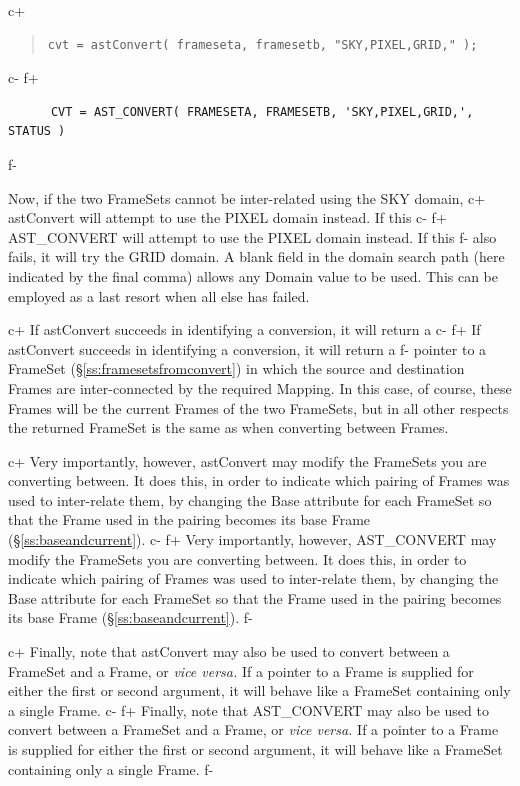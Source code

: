 \documentclass[twoside,11pt]{article}
\newcommand{\secref}[1]{\S\ref{#1}}
\newcommand{\secref}[1]{\ref{#1}}
\begin{document}
c+
\begin{quote}
\small
\begin{verbatim}
cvt = astConvert( frameseta, framesetb, "SKY,PIXEL,GRID," );
\end{verbatim}
\normalsize
\end{quote}
c-
f+
\small
\begin{verbatim}
      CVT = AST_CONVERT( FRAMESETA, FRAMESETB, 'SKY,PIXEL,GRID,', STATUS )
\end{verbatim}
\normalsize
f-

Now, if the two FrameSets cannot be inter-related using the SKY domain,
c+
astConvert will attempt to use the PIXEL domain instead. If this
c-
f+
AST\_CONVERT will attempt to use the PIXEL domain instead. If this
f-
also fails, it will try the GRID domain. A blank field in the domain
search path (here indicated by the final comma) allows any Domain
value to be used. This can be employed as a last resort when all else
has failed.

c+
If astConvert succeeds in identifying a conversion, it will return a
c-
f+
If astConvert succeeds in identifying a conversion, it will return a
f-
pointer to a FrameSet (\secref{ss:framesetsfromconvert}) in which the
source and destination Frames are inter-connected by the required
Mapping. In this case, of course, these Frames will be the current
Frames of the two FrameSets, but in all other respects the returned
FrameSet is the same as when converting between Frames.

c+
Very importantly, however, astConvert may modify the FrameSets you are
converting between. It does this, in order to indicate which pairing
of Frames was used to inter-relate them, by changing the Base
attribute for each FrameSet so that the Frame used in the pairing
becomes its base Frame (\secref{ss:baseandcurrent}).
c-
f+
Very importantly, however, AST\_CONVERT may modify the FrameSets you
are converting between. It does this, in order to indicate which
pairing of Frames was used to inter-relate them, by changing the Base
attribute for each FrameSet so that the Frame used in the pairing
becomes its base Frame (\secref{ss:baseandcurrent}).
f-

c+
Finally, note that astConvert may also be used to convert between a
FrameSet and a Frame, or {\em{vice versa.}} If a pointer to a Frame is
supplied for either the first or second argument, it will behave like
a FrameSet containing only a single Frame.
c-
f+
Finally, note that AST\_CONVERT may also be used to convert between a
FrameSet and a Frame, or {\em{vice versa.}} If a pointer to a Frame is
supplied for either the first or second argument, it will behave like
a FrameSet containing only a single Frame.
f-
\end{document}
